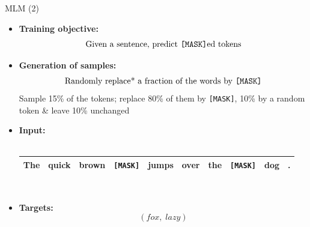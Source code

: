 \begin{frame}{MLM (2)}

\begin{itemize}
\item \textbf{Training objective:} $$\text{Given a sentence, predict \texttt{[MASK]}ed tokens}$$
\item \textbf{Generation of samples:} $$\text{Randomly replace* a fraction of the words by \texttt{[MASK]}}$$
  \scriptsize *Sample 15\% of the tokens; replace 80\% of them by \texttt{[MASK]}, 10\% by a random token \& leave 10\% unchanged
\item \normalsize \textbf{Input:}\\\mbox{}\\
			\footnotesize
\begin{tabular}{|cccccccccc|}
\hline
The & quick & brown & \cellcolor{blue!65}\texttt{[MASK]} & jumps & over & the & \cellcolor{blue!65}\texttt{[MASK]} & dog & . \\
\hline
\end{tabular}\\\mbox{}
\item \normalsize \textbf{Targets:} $$(fox,\; lazy)$$
\end{itemize}

\end{frame}


